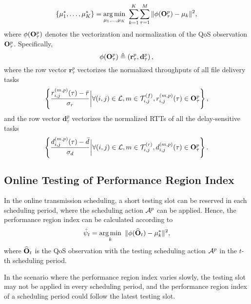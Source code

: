 \begin{equation}
   \{\mu_1^*, \ldots, \mu_{K}^*\}  =
   \operatorname*{arg\,min}
   \limits_{\mu_1, \ldots, \mu_{K}} \
   \sum_{k=1}^K
   \sum_{\tau=1}^M
   \Vert \phi(\mathbf{O}^{p}_\tau) - \mu_k \Vert^2,
\end{equation}
where $\phi(\mathbf{O}^{p}_\tau)$ denotes the vectorization and normalization of the QoS observation $\mathbf{O}^{p}_\tau$. Specifically,
\begin{equation}
   \phi(\mathbf{O}^{p}_\tau) \triangleq
   \left(
   \mathbf{r}_{\tau}^p, \mathbf{d}_{\tau}^p
   \right),
\end{equation}
where the row vector $\mathbf{r}_{\tau}^p$ vectorizes the normalized throughputs of all file delivery tasks
\begin{equation*}
   \left\{
      \frac{ r_{i,j}^{(m,p)}(\tau) - \bar{r} }{ \sigma_{r} }
      \bigg|
      \forall (i,j) \in{\mathcal{L}}, {m} \in{\mathcal{T}_{i,j}^{(f)}}, r_{i,j}^{(m,p)}(\tau) \in \mathbf{O}^{p}_\tau
   \right\},
\end{equation*}
and the row vector $\mathbf{d}_{\tau}^p$ vectorizes the normalized RTTs of all the delay-sensitive tasks
\begin{equation*}
   \left\{
      \frac{ d_{i,j}^{(m,p)}(\tau) - \bar{d} }{ \sigma_{d} }
      \bigg| 
      \forall (i,j) \in{\mathcal{L}}, {m} \in{\mathcal{T}_{i,j}^{(r)}}, d_{i,j}^{(m,p)}(\tau) \in \mathbf{O}^{p}_\tau
   \right\}.
\end{equation*}

\subsection{Online Testing of Performance Region Index}

In the online transmission scheduling, a short testing slot can be reserved in each scheduling period, where the scheduling action $\mathcal{A}^{p}$ can be applied. Hence, the performance region index can be calculated according to
\begin{equation}
   \label{eq:raw performance region index}
   \hat{\psi}_t =
   \operatorname*{arg\,min}\limits_{k} \
   \Vert \phi(\widehat{\mathbf{O}}_t) - \mu_k^* \Vert^2,
\end{equation}
where $\widehat{\mathbf{O}}_t$ is the QoS observation with the testing scheduling action $\mathcal{A}^{p}$ in the $t$-th scheduling period.

In the scenario where the performance region index varies slowly, the testing slot may not be applied in every scheduling period, and the performance region index of a scheduling period could follow the latest testing slot.


